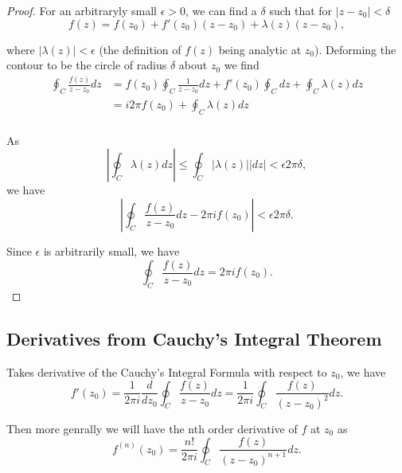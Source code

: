 \documentclass{article}
\begin{document}
\begin{proof}
For an arbitraryly small $\epsilon >0$, we can find a $\delta$ such that for $|z-z_0|<\delta$
\begin{equation}
    f(z)=f(z_0)+f'(z_0)(z-z_0)+\lambda(z)(z-z_0),
\end{equation}

where $|\lambda(z)|<\epsilon$ (the definition of $f(z)$ being analytic at $z_0$). Deforming the contour to be the circle of radius $\delta$ about $z_0$ we find
\begin{equation}
    \begin{split}
        \oint_C\frac{f(z)}{z-z_0}dz &=f(z_0)\oint_C \frac{1}{z-z_0}dz + f'(z_0)\oint_C  dz + \oint_C \lambda(z) dz\\
        &=i2\pi f(z_0) + \oint_C\lambda(z)dz\\
    \end{split}
\end{equation}

As
\begin{equation}
    \left|\oint_C\lambda(z)dz\right|\leq \oint_C |\lambda(z)||dz| < \epsilon 2\pi \delta,
\end{equation}
we have
\begin{equation}
    \left|\oint_C\frac{f(z)}{z-z_0}dz - 2\pi i f(z_0)\right| < \epsilon 2\pi \delta.
\end{equation}

Since $\epsilon$ is arbitrarily small, we have
\begin{equation}
    \oint_C\frac{f(z)}{z-z_0}dz = 2\pi i f(z_0).
\end{equation}
\end{proof}

\subsection{Derivatives from Cauchy's Integral Theorem}

Takes derivative of the Cauchy's Integral Formula with respect to $z_0$, we have
\begin{equation}
    f'(z_0)=\frac{1}{2\pi i}\frac{d}{d z_0}\oint_C\frac{f(z)}{z-z_0}dz = \frac{1}{2\pi i}\oint_C\frac{f(z)}{(z-z_0)^2}dz.
\end{equation}

Then more genrally we will have the nth order derivative of $f$ at $z_0$ as
\begin{equation}
    f^{(n)}(z_0)=\frac{n!}{2\pi i}\oint_C\frac{f(z)}{(z-z_0)^{n+1}}dz.
\end{equation}
\end{document}
